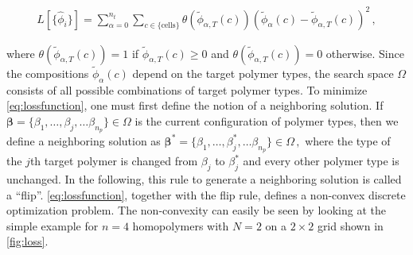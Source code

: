 \documentclass[bachelor,       %
               oneside,        %
               BCOR10mm,       %
               ngerman, english %
               ]{GAUBM}
\begin{document}
\begin{align}
    L[\{\hat\phi_i\}]=\sum_{\alpha=0}^{n_t}\sum_{c\in \{\text{cells}\}}\theta(\tilde\phi_{\alpha,T}(c))\left(\tilde\phi_\alpha(c)-\tilde\phi_{\alpha,T}(c)\right)^2\,,
    \label{eq:lossfunction}
\end{align}

where $\theta(\tilde\phi_{\alpha,T}(c))=1$ if $\tilde\phi_{\alpha,T}(c)\ge 0$ and $\theta(\tilde\phi_{\alpha,T}(c))=0$ otherwise. Since the compositions $\tilde\phi_\alpha(c)$ depend on the target polymer types, the search space $\Omega$ consists of all possible combinations of target polymer types. To minimize \autoref{eq:lossfunction}, one must first define the notion of a neighboring solution. If $\pmb{\beta}=\{\beta_1,\dots,\beta_j,\dots\beta_{n_p}\}\in\Omega$ is the current configuration of polymer types, then we define a neighboring solution as $\pmb{\beta}^*=\{\beta_1,\dots,\beta^*_j,\dots\beta_{n_p}\}\in\Omega\,,$ where the type of the $j$th target polymer is changed from $\beta_j$ to $\beta_j^*$ and every other polymer type is unchanged. In the following, this rule to generate a neighboring solution is called a \enquote{flip}. \autoref{eq:lossfunction}, together with the flip rule, defines a non-convex discrete optimization problem. The non-convexity can easily be seen by looking at the simple example for $n=4$ homopolymers with $N=2$ on a $2\times 2$ grid shown in \autoref{fig:loss}.
\end{document}
